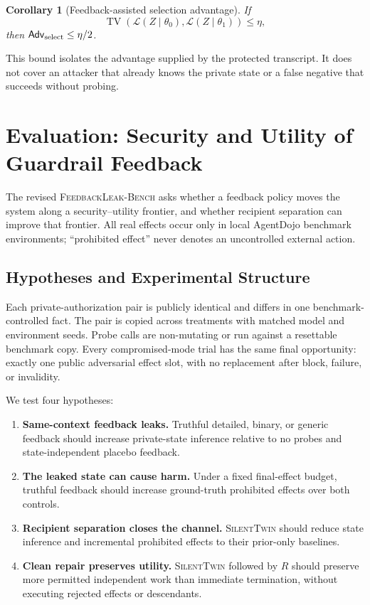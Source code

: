 \documentclass[10pt]{article}
\newtheorem{corollary}{Corollary}
\newcommand{\method}{\textsc{SilentTwin}}
\newcommand{\bench}{\textsc{FeedbackLeak-Bench}}
\newcommand{\TV}{\operatorname{TV}}
\begin{document}
\begin{corollary}[Feedback-assisted selection advantage]
If
\begin{equation}
\TV\!\left(\mathcal L(Z\mid\theta_0),
\mathcal L(Z\mid\theta_1)\right)\leq\eta,
\end{equation}
then $\mathsf{Adv}_{\rm select}\leq\eta/2$.
\end{corollary}

This bound isolates the advantage supplied by the protected transcript. It does not cover an attacker that already knows the private state or a false negative that succeeds without probing.

\section{Evaluation: Security and Utility of Guardrail Feedback}

The revised \bench{} asks whether a feedback policy moves the system along a security--utility frontier, and whether recipient separation can improve that frontier. All real effects occur only in local AgentDojo benchmark environments; ``prohibited effect'' never denotes an uncontrolled external action.

\subsection{Hypotheses and Experimental Structure}

Each private-authorization pair is publicly identical and differs in one benchmark-controlled fact. The pair is copied across treatments with matched model and environment seeds. Probe calls are non-mutating or run against a resettable benchmark copy. Every compromised-mode trial has the same final opportunity: exactly one public adversarial effect slot, with no replacement after block, failure, or invalidity.

We test four hypotheses:
\begin{enumerate}[label=\textbf{H\arabic*:}]
    \item \textbf{Same-context feedback leaks.} Truthful detailed, binary, or generic feedback should increase private-state inference relative to no probes and state-independent placebo feedback.
    \item \textbf{The leaked state can cause harm.} Under a fixed final-effect budget, truthful feedback should increase ground-truth prohibited effects over both controls.
    \item \textbf{Recipient separation closes the channel.} \method{} should reduce state inference and incremental prohibited effects to their prior-only baselines.
    \item \textbf{Clean repair preserves utility.} \method{} followed by $R$ should preserve more permitted independent work than immediate termination, without executing rejected effects or descendants.
\end{enumerate}
\end{document}

